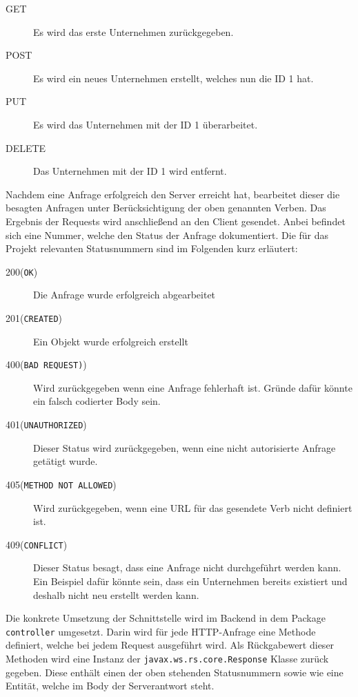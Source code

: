 \begin{description} 
	\item[GET] Es wird das erste Unternehmen zurückgegeben.
	\item[POST] Es wird ein neues Unternehmen erstellt, welches nun die ID 1 hat.
	\item[PUT] Es wird das Unternehmen mit der ID 1 überarbeitet.
	\item[DELETE] Das Unternehmen mit der ID 1 wird entfernt.
\end{description}

Nachdem eine Anfrage erfolgreich den Server erreicht hat, bearbeitet dieser die besagten Anfragen unter Berücksichtigung der oben genannten Verben. Das Ergebnis der Requests wird anschließend an den Client gesendet. Anbei befindet sich eine Nummer, welche den Status der Anfrage dokumentiert. Die für das Projekt relevanten Statusnummern sind im Folgenden kurz erläutert:


\begin{description}
	\item[200(\texttt{OK})] Die Anfrage wurde erfolgreich abgearbeitet
	\item[201(\texttt{CREATED})] Ein Objekt wurde erfolgreich erstellt
	
	\item[400(\texttt{BAD REQUEST)})] Wird zurückgegeben wenn eine Anfrage fehlerhaft ist. Gründe dafür könnte ein falsch codierter Body sein.
	\item[401(\texttt{UNAUTHORIZED})] Dieser Status wird zurückgegeben, wenn eine nicht autorisierte Anfrage getätigt wurde.
	\item[405(\texttt{METHOD NOT ALLOWED})] Wird zurückgegeben, wenn eine URL für das gesendete Verb nicht definiert ist.
	\item[409(\texttt{CONFLICT})] Dieser Status besagt, dass eine Anfrage nicht durchgeführt werden kann. Ein Beispiel dafür könnte sein, dass ein Unternehmen bereits existiert und deshalb nicht neu erstellt werden kann.
\end{description}

Die konkrete Umsetzung der Schnittstelle wird im Backend in dem Package \texttt{controller} umgesetzt. 
Darin wird für jede \ac{HTTP}-Anfrage eine Methode definiert, welche bei jedem Request ausgeführt wird.
Als Rückgabewert dieser Methoden wird eine Instanz der \texttt{javax.ws.rs.core.Response} Klasse zurück gegeben.
Diese enthält einen der oben stehenden Statusnummern sowie wie eine Entität, welche im Body der Serverantwort steht.



